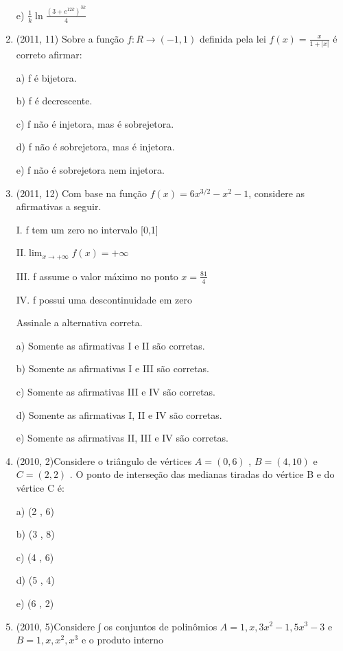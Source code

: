 \documentclass{article}
\begin{document}
\begin{enumerate}
e) $\frac{1}{k} \ln \frac{(3 + e^{12k})^{3k}}{4} $\newline


\item(2011, 11) Sobre a função $f : R \rightarrow (-1, 1)$ definida pela lei $f (x)=\frac{x}{1+|x|}$ é correto afirmar:

a) f é bijetora.

b) f é decrescente.

c) f não é injetora, mas é sobrejetora.

d) f não é sobrejetora, mas é injetora.

e) f não é sobrejetora nem injetora.\newline




\item(2011, 12) Com base na função $f (x) = 6x^{3/2} - x^2 - 1$, considere as afirmativas a seguir.

I. f tem um zero no intervalo [0,1]

II.$\lim_{x \rightarrow +\infty} f (x) = +\infty$

III. f assume o valor máximo no ponto $x =\frac{81}{4}$

IV. f possui uma descontinuidade em zero

Assinale a alternativa correta.

a) Somente as afirmativas I e II são corretas.

b) Somente as afirmativas I e III são corretas.

c) Somente as afirmativas III e IV são corretas.

d) Somente as afirmativas I, II e IV são corretas.

e) Somente as afirmativas II, III e IV são corretas.\newline





\item(2010, 2)Considere o triângulo de vértices $A = (0 , 6)$ , $B = (4 , 10)$ e $C = (2 , 2)$ .
O ponto de interseção das medianas tiradas do vértice B e do vértice C é:

a) (2 , 6)

b) (3 , 8)

c) (4 , 6)

d) (5 , 4)

e) (6 , 2)



\item(2010, 5)Considere ∫ os conjuntos de polinômios $A = {1 , x, 3x^2 - 1 , 5x^3 - 3}$ e $B = {1 , x, x^2 , x^3 }$ e o produto interno 


\end{enumerate}
\end{document}
